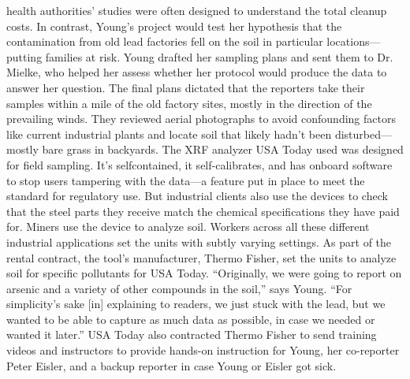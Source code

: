 health authorities' studies were often designed to understand the total
cleanup costs. In contrast, Young's project would test her hypothesis that
the contamination from old lead factories fell on the soil in particular locations—
putting families at risk.
Young drafted her sampling plans and sent them to Dr. Mielke, who helped
her assess whether her protocol would produce the data to answer her question.
The final plans dictated that the reporters take their samples within a
mile of the old factory sites, mostly in the direction of the prevailing winds.
They reviewed aerial photographs to avoid confounding factors like current
industrial plants and locate soil that likely hadn't been disturbed—mostly
bare grass in backyards.
The XRF analyzer USA Today used was designed for field sampling. It's selfcontained,
it self-calibrates, and has onboard software to stop users tampering
with the data—a feature put in place to meet the standard for regulatory
use. But industrial clients also use the devices to check that the steel parts
they receive match the chemical specifications they have paid for. Miners
use the device to analyze soil. Workers across all these different industrial
applications set the units with subtly varying settings. As part of the rental
contract, the tool's manufacturer, Thermo Fisher, set the units to analyze
soil for specific pollutants for USA Today.
``Originally, we were going to report on arsenic and a variety of other compounds
in the soil,'' says Young. ``For simplicity's sake [in] explaining to readers,
we just stuck with the lead, but we wanted to be able to capture as much
data as possible, in case we needed or wanted it later.'' USA Today also contracted
Thermo Fisher to send training videos and instructors to provide
hands-on instruction for Young, her co-reporter Peter Eisler, and a backup
reporter in case Young or Eisler got sick.

